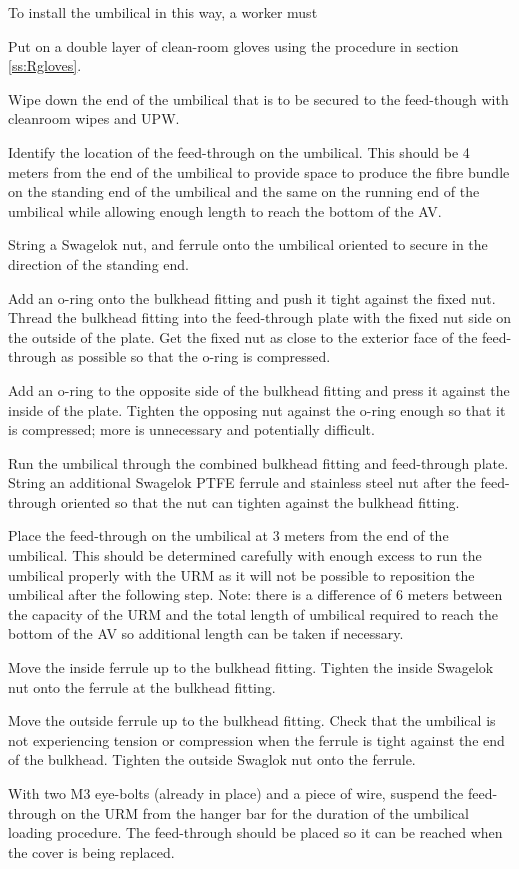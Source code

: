 \documentclass[11pt]{article}
\begin{document}
To install the umbilical in this way, a worker must
\begin{answerlist}
\item Put on a double layer of clean-room gloves using the procedure in section \ref{ss:Rgloves}.
\item Wipe down the end of the umbilical that is to be secured to the
  feed-though with cleanroom wipes and UPW. 
\item Identify the location of the feed-through on the umbilical. This
  should be 4 meters from the end of the umbilical to provide space to
  produce the fibre bundle on the standing end of the umbilical and
  the same on the running end of the umbilical while allowing enough
  length to reach the bottom of the AV.
\item String a Swagelok nut, and ferrule onto the umbilical oriented
  to secure in the direction of the standing end.
\item Add an o-ring onto the bulkhead fitting and push it tight
  against the fixed nut. Thread the bulkhead fitting into the
  feed-through plate with the fixed nut side on the outside of the
  plate. Get the fixed nut as close to the exterior face of the
  feed-through as possible so that the o-ring is compressed.
\item Add an o-ring to the opposite side of the bulkhead fitting and
  press it against the inside of the plate. Tighten the opposing nut
  against the o-ring enough so that it is compressed; more is
  unnecessary and potentially difficult.
\item Run the umbilical through the combined bulkhead fitting and
  feed-through plate. String an additional Swagelok PTFE ferrule and
  stainless steel nut after the feed-through oriented so that the nut
  can tighten against the bulkhead fitting.
\item Place the feed-through on the umbilical at 3 meters from the end
  of the umbilical. This should be determined carefully with enough
  excess to run the umbilical properly with the URM as it will not be
  possible to reposition the umbilical after the following step. Note:
  there is a difference of 6 meters between the capacity of the URM
  and the total length of umbilical required to reach the bottom of
  the AV so additional length can be taken if necessary.
\item Move the inside ferrule up to the bulkhead fitting. Tighten the
  inside Swagelok nut onto the ferrule at the bulkhead fitting.
\item Move the outside ferrule up to the bulkhead fitting. Check that
  the umbilical is not experiencing tension or compression when the
  ferrule is tight against the end of the bulkhead. Tighten the
  outside Swaglok nut onto the ferrule.
\item With two M3 eye-bolts (already in place) and a piece of wire,
  suspend the feed-through on the URM from the hanger bar for the
  duration of the umbilical loading procedure. The feed-through should
  be placed so it can be reached when the cover is being replaced.
\end{answerlist}
\end{document}
